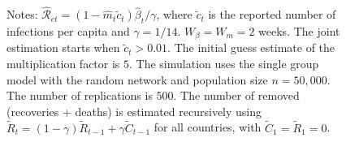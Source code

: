 \documentclass[12pt]{article}
\begin{document}
\begin{figure}[tp]
\begin{footnotesize}
\begin{center}
\begin{tabular}
{\includegraphics[
height=1.9951in,
width=2.6524in
]%
{figs/Italy_ER_N50000_guess5_2W_TR_Re.png}%
}
\\
&  & \\
Spain &  & UK\\%
{\includegraphics[
height=1.9951in,
width=2.6524in
]%
{figs/Spain_ER_N50000_guess5_2W_TR_Re.png}%
}
&  &
{\includegraphics[
height=1.9951in,
width=2.6524in
]%
{figs/UK_ER_N50000_guess5_2W_TR_Re.png}%
}
\end{tabular}



\end{center}

%

\vspace{-0.1cm}%
Notes: $\mathcal{\hat{R}}_{et}=\left(  1-\hat{m}_{t}\tilde{c}_{t}\right)
\hat{\beta}_{t}/\gamma$, where $\tilde{c}_{t}$ is the reported number of
infections per capita and $\gamma=1/14$. $W_{\beta}=W_{m}=2$ weeks. The joint
estimation starts when $\tilde{c}_{t}>0.01$. The initial guess estimate of the
multiplication factor is $5$. The simulation uses the single group model with
the random network and population size $n=50,000$. The number of replications
is $500$. The number of removed (recoveries + deaths) is estimated recursively
using $\tilde{R}_{t}=\left(  1-\gamma\right)  \tilde{R}_{t-1}+\gamma\tilde
{C}_{t-1}$ for all countries, with $\tilde{C}_{1}=\tilde{R}_{1}=0$.%

\end{footnotesize}%
%

\end{figure}%
\end{document}
